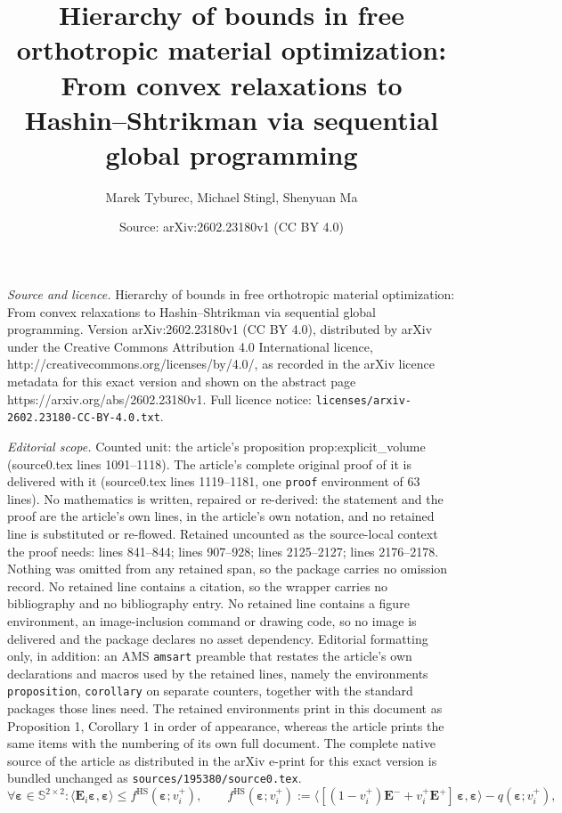 \documentclass[10pt,a4paper]{amsart}
\title{Hierarchy of bounds in free orthotropic material optimization: From convex relaxations to Hashin--Shtrikman via sequential global programming}
\author{Marek Tyburec, Michael Stingl, Shenyuan Ma}
\date{Source: arXiv:2602.23180v1 (CC BY 4.0)}
\newcommand{\Ei}{\tensf{E}_i}                       %
\newcommand{\Emax}{\tensf{E}^{+}}                   %
\newcommand{\Emin}{\tensf{E}^{-}}                   %
\newcommand{\strain}{\tenss{\varepsilon}}           %
\newcommand{\tensf}[1]{\bm{\mathbf{#1}}}            %
\newcommand{\tenss}[1]{\bm{\mathbf{#1}}}            %
\begin{document}
\maketitle

\noindent\emph{Source and licence.} Hierarchy of bounds in free orthotropic material optimization: From convex relaxations to Hashin--Shtrikman via sequential global programming. Version arXiv:2602.23180v1 (CC BY 4.0), distributed by arXiv under the Creative Commons Attribution 4.0 International licence, http://creativecommons.org/licenses/by/4.0/, as recorded in the arXiv licence metadata for this exact version and shown on the abstract page https://arxiv.org/abs/2602.23180v1. Full licence notice: \texttt{licenses/arxiv-2602.23180-CC-BY-4.0.txt}.\par\smallskip

\noindent\textit{Editorial scope.} Counted unit: the article's proposition prop:explicit\_volume (source0.tex lines 1091--1118). The article's complete original proof of it is delivered with it (source0.tex lines 1119--1181, one \texttt{proof} environment of 63 lines). No mathematics is written, repaired or re-derived: the statement and the proof are the article's own lines, in the article's own notation, and no retained line is substituted or re-flowed.  Retained uncounted as the source-local context the proof needs: lines 841--844; lines 907--928; lines 2125--2127; lines 2176--2178.  Nothing was omitted from any retained span, so the package carries no omission record.  No retained line contains a citation, so the wrapper carries no bibliography and no bibliography entry.  No retained line contains a figure environment, an image-inclusion command or drawing code, so no image is delivered and the package declares no asset dependency.  Editorial formatting only, in addition: an AMS \texttt{amsart} preamble that restates the article's own declarations and macros used by the retained lines, namely the environments \texttt{proposition}, \texttt{corollary} on separate counters, together with the standard packages those lines need.  The retained environments print in this document as Proposition 1, Corollary 1 in order of appearance, whereas the article prints the same items with the numbering of its own full document.  The complete native source of the article as distributed in the arXiv e-print for this exact version is bundled unchanged as \texttt{sources/195380/source0.tex}.
\begin{equation}\label{eq:hashin_shtrikman}
    \forall \strain \in \mathbb{S}^{2\times2}: \langle \Ei \strain, \strain \rangle \le f^\mathrm{HS}(\strain;v_i^+),\qquad f^\mathrm{HS}(\strain;v_i^+):=\langle [(1-v_i^{+})\Emin+v_i^{+}\Emax]\,\strain,\strain\rangle
- q(\strain;v_i^+),
\end{equation}
\end{document}

